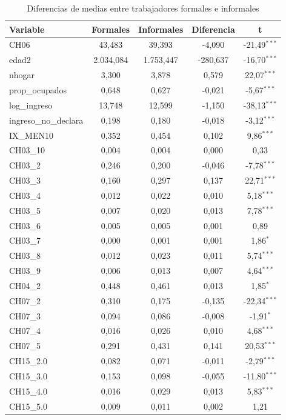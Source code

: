 \begin{table}[H]
\centering
\caption{Diferencias de medias entre trabajadores formales e informales}
\label{tab:dif_medias_completa}
\begin{tabular}{lcccc}
\toprule
Variable & Formales & Informales & Diferencia & t \\
\midrule
CH06 & 43,483 & 39,393 & -4,090 & -21,49$^{***}$ \\
edad2 & 2.034,084 & 1.753,447 & -280,637 & -16,70$^{***}$ \\
nhogar & 3,300 & 3,878 & 0,579 & 22,07$^{***}$ \\
prop\_ocupados & 0,648 & 0,627 & -0,021 & -5,67$^{***}$ \\
log\_ingreso & 13,748 & 12,599 & -1,150 & -38,13$^{***}$ \\
ingreso\_no\_declara & 0,198 & 0,180 & -0,018 & -3,12$^{***}$ \\
IX\_MEN10 & 0,352 & 0,454 & 0,102 & 9,86$^{***}$ \\
CH03\_10 & 0,004 & 0,004 & 0,000 & 0,33 \\
CH03\_2 & 0,246 & 0,200 & -0,046 & -7,78$^{***}$ \\
CH03\_3 & 0,160 & 0,297 & 0,137 & 22,71$^{***}$ \\
CH03\_4 & 0,012 & 0,022 & 0,010 & 5,18$^{***}$ \\
CH03\_5 & 0,007 & 0,020 & 0,013 & 7,78$^{***}$ \\
CH03\_6 & 0,005 & 0,005 & 0,001 & 0,89 \\
CH03\_7 & 0,000 & 0,001 & 0,001 & 1,86$^{*}$ \\
CH03\_8 & 0,012 & 0,023 & 0,011 & 5,74$^{***}$ \\
CH03\_9 & 0,006 & 0,013 & 0,007 & 4,64$^{***}$ \\
CH04\_2 & 0,448 & 0,461 & 0,013 & 1,85$^{*}$ \\
CH07\_2 & 0,310 & 0,175 & -0,135 & -22,34$^{***}$ \\
CH07\_3 & 0,094 & 0,086 & -0,008 & -1,91$^{*}$ \\
CH07\_4 & 0,016 & 0,026 & 0,010 & 4,68$^{***}$ \\
CH07\_5 & 0,291 & 0,431 & 0,141 & 20,53$^{***}$ \\
CH15\_2.0 & 0,082 & 0,071 & -0,011 & -2,79$^{***}$ \\
CH15\_3.0 & 0,153 & 0,098 & -0,055 & -11,80$^{***}$ \\
CH15\_4.0 & 0,016 & 0,029 & 0,013 & 5,83$^{***}$ \\
CH15\_5.0 & 0,009 & 0,011 & 0,002 & 1,21 \\

\end{tabular}
\end{table}
